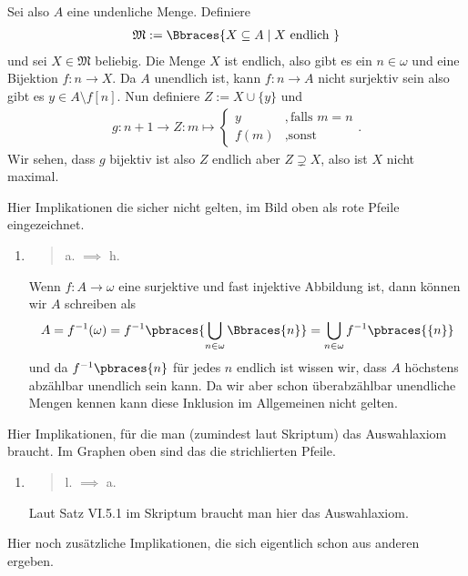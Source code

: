 \begin{solution}
\begin{enumerate}[label = \texttt{ad}]
	Sei also $A$ eine undenliche Menge. Definiere
	\begin{align*}
	\mathfrak{M}:=\Bbraces{X \subseteq A \mid X \text{ endlich }}
	\end{align*}
	und sei $X \in \mathfrak{M}$ beliebig. Die Menge $X$ ist endlich, also gibt es ein $n \in \omega$ und eine Bijektion $f:n \to X$. Da $A$ unendlich ist, kann $f:n \to A$ nicht surjektiv sein also gibt es $y \in A \setminus f[n]$. Nun definiere $Z := X \cup \{y\}$ und
	\begin{align*}
	g:n + 1 \to Z: m \mapsto
	\begin{cases}
	y & ,\text{falls } m = n \\
	f(m) & ,\text{sonst }
	\end{cases}.
	\end{align*}
	Wir sehen, dass $g$ bijektiv ist also $Z$ endlich aber $Z \supsetneq X$, also ist $X$ nicht maximal.
\end{enumerate}




Hier Implikationen die sicher nicht gelten, im Bild oben als rote Pfeile eingezeichnet.

\begin{enumerate}[label = \texttt{ad}]
	\item \blockquote{a. $\implies$ h.}: Wenn $f: A \to \omega$ eine surjektive und fast injektive Abbildung ist, dann können wir $A$ schreiben als
	\begin{align*}
		A = f^{-1}(\omega) = f^{-1}\pbraces{\bigcup_{n \in \omega} \Bbraces{n}} = \bigcup_{n \in \omega} f^{-1}\pbraces{\{n\}}
	\end{align*}
	und da $f^{-1}\pbraces{{n}}$ für jedes $n$ endlich ist wissen wir, dass $A$ höchstens abzählbar unendlich sein kann. Da wir aber schon überabzählbar unendliche Mengen kennen kann diese Inklusion im Allgemeinen nicht gelten. 
\end{enumerate}


Hier Implikationen, für die man (zumindest laut Skriptum) das Auswahlaxiom braucht. Im Graphen oben sind das die strichlierten Pfeile.
\begin{enumerate}[label = \texttt{ad}]
	\item \blockquote{l. $\implies$ a.}:
	
	Laut Satz VI.5.1 im Skriptum braucht man hier das Auswahlaxiom.
\end{enumerate}


Hier noch zusätzliche Implikationen, die sich eigentlich schon aus anderen ergeben.



\end{solution}
